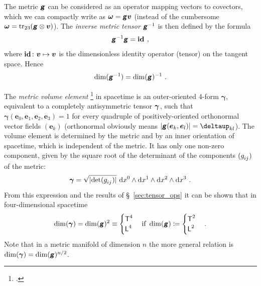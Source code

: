 \documentclass[\ifafour a4paper,12pt,\else a5paper,10pt,\fi%
onecolumn,oneside,article,%
british%
]{memoir}
\makeatletter
\theoremstyle{remark}
\theoremstyle{innote}
\newcommand*{\mathte}[1]{\textbf{\textit{\textsf{#1}}}}
\newcommand*{\citep}{\footcites}
\newcommand*{\delt}{\deltaup}%
\newcommand*{\di}{\mathrm{d}}%
\DeclareMathOperator{\tr}{tr}%
\newcommand*{\defd}{\coloneqq}
\DeclarePairedDelimiter\abs{\lvert}{\rvert}
\renewcommand*{\|}[1][]{\nonscript\,#1\vert\nonscript\;\mathopen{}}
\newcommand*{\sect}{\S}%
\newcommand*{\q}{}%
\DeclareRobustCommand*{\q}{%
  \mathbin{\mathpalette\bigcdot@{}}%
}
\newcommand*{\bigcdot@scalefactor}{0.7}
\newcommand*{\bigcdot@widthfactor}{1.5}
\newcommand*{\bigcdot@}[2]{%
  \sbox0{$#1\vcenter{}$}%
  \sbox2{$#1\cdot\m@th$}%
  \hbox to \bigcdot@widthfactor\wd2{%
    \hfil
    \raise\ht0\hbox{%
      \scalebox{\bigcdot@scalefactor}{%
        \lower\ht0\hbox{$#1\bullet\m@th$}%
      }%
    }%
    \hfil
  }%
}
\newcommand*{\Un}{\textsf{1}}
\newcommand*{\Le}{\textsf{L}}
\newcommand*{\Ti}{\textsf{T}}
\newcommand*{\yg}{\mathte{g}}
\newcommand*{\yom}{\bm{\omega}}
\newcommand*{\yv}{\bm{v}}
\renewcommand*{\i}{\indices}
\newcommand*{\dix}[1][i]{\di x^{#1}}
\newcommand*{\id}{\mathbf{id}}%
\newcommand*{\ye}{\bm{e}}
\newcommand*{\ygv}{\bm{\gamma}}
\makeatother
\begin{document}
The metric $\yg$ can be considered as an operator mapping vectors to
covectors, which we can compactly write as $\yom=\yg\yv$ (instead of the cumbersome
$\yom = \tr_{23}(\yg\otimes\yv)$). The \emph{inverse metric tensor}
$\yg\i{^{-1}^{\q\q}}$ is then defined by the formula
\begin{equation}
  \label{eq:inverse_g}
  \yg^{-1}\yg = \id\i{^{\q}_{\q}} \ ,
\end{equation}
where $\id\i{^{\q}_{\q}}\colon \bm{v} \mapsto \bm{v}$ is the dimensionless
identity operator (tensor) on the tangent space. Hence
\begin{equation}
  \label{eq:dim_ig}
  \dim(\yg^{-1}) = \dim(\yg)^{-1} \ .
\end{equation}

\medskip

The \emph{metric volume element} \citep[\sect~6.2]{abrahametal1983_r1988}
in spacetime is an outer-oriented 4-form $\ygv$, equivalent to a completely
antisymmetric tensor $\ygv\i{_{\q\q\q\q}}$, such that
$\ygv(\ye_{0},\ye_{1},\ye_{2},\ye_{3})=1$ for every quadruple of
positively-oriented orthonormal vector fields $(\ye_{k})$ (orthonormal
obviously means $\abs{\yg(\ye_{k},\ye_{l})}=\delt_{kl}$). The volume element
is determined by the metric and by an inner orientation of spacetime, which
is independent of the metric. It has only one non-zero component, given by
the square root of the determinant of the %
components $(g\i{_{ij}})$ of the metric:
\begin{equation}
  \label{eq:volume_elem}
  \ygv =
  \sqrt{\smash[b]{\abs{\det(g\i{_{ij}})}}}\ \dix[0]\land\dix[1]\land\dix[2]\land\dix[3] \ .
\end{equation}
From this expression and the results of \sect~\ref{sec:tensor_ops} it can
be shown that in four-dimensional spacetime
\begin{equation}
  \label{eq:dim_volume_elem}
  \dim(\ygv) = \dim(\yg)^{2} \equiv
    \begin{cases}
    \Ti^{4} \\
    \Le^{4}
  \end{cases}
  \text{if }\dim(\yg)\defd
  \begin{cases}
     \Ti^2 \\
    \Le^2
  \end{cases}.
\end{equation}
Note that in a metric manifold of dimension $n$ the more general relation
is $\dim(\ygv) = \dim(\yg)^{n/2}$.
\end{document}
